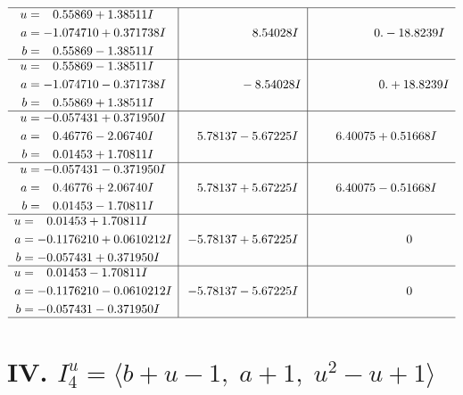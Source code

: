 \documentclass[1p]{elsarticle_modified}
\theoremstyle{definition}
\begin{document}
$$\begin{array}{c|c|c}
 \hline 
\begin{aligned}
u &= \phantom{-}0.55869 + 1.38511 I \\
a &= -1.074710 + 0.371738 I \\
b &= \phantom{-}0.55869 - 1.38511 I\end{aligned}
 & \phantom{-0.000000 -}8.54028 I & \phantom{-0.000000 } 0. - 18.8239 I \\ \hline\begin{aligned}
u &= \phantom{-}0.55869 - 1.38511 I \\
a &= -1.074710 - 0.371738 I \\
b &= \phantom{-}0.55869 + 1.38511 I\end{aligned}
 & \phantom{-0.000000 } -8.54028 I & \phantom{-0.000000 -}0. + 18.8239 I \\ \hline\begin{aligned}
u &= -0.057431 + 0.371950 I \\
a &= \phantom{-}0.46776 - 2.06740 I \\
b &= \phantom{-}0.01453 + 1.70811 I\end{aligned}
 & \phantom{-}5.78137 - 5.67225 I & \phantom{-}6.40075 + 0.51668 I \\ \hline\begin{aligned}
u &= -0.057431 - 0.371950 I \\
a &= \phantom{-}0.46776 + 2.06740 I \\
b &= \phantom{-}0.01453 - 1.70811 I\end{aligned}
 & \phantom{-}5.78137 + 5.67225 I & \phantom{-}6.40075 - 0.51668 I \\ \hline\begin{aligned}
u &= \phantom{-}0.01453 + 1.70811 I \\
a &= -0.1176210 + 0.0610212 I \\
b &= -0.057431 + 0.371950 I\end{aligned}
 & -5.78137 + 5.67225 I & \phantom{-0.000000 } 0 \\ \hline\begin{aligned}
u &= \phantom{-}0.01453 - 1.70811 I \\
a &= -0.1176210 - 0.0610212 I \\
b &= -0.057431 - 0.371950 I\end{aligned}
 & -5.78137 - 5.67225 I & \phantom{-0.000000 } 0\\
 \hline 
 \end{array}$$\newpage\newpage\renewcommand{\arraystretch}{1}
\centering \section*{IV. $I^u_{4}= \langle b+u-1,\;a+1,\;u^2- u+1 \rangle$}
\end{document}
